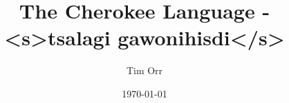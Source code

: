 \documentclass{book}
\begin{document}
\title{\Huge\bf The Cherokee Language - <s>tsalagi gawonihisdi</s>}
\author{Tim Orr}
\date{\today}
\maketitle

\tableofcontents


\setcounter{secnumdepth}{0}

\begin{comment}
chapter{Publishing Info}
%
chapter{Special Thanks}

input{whatabout.tex}

chapters go here

chapter{Verb Conjugation}
chapter{Dictionary}
chapter{Lookup by Syllable Count} Like Radical lookup in Japanese
chapter{Answers to Reading and Exercises} These would be where there are questions that have answers and where you would put dialog in tsalagi when reading syllabary.

chapter{Index}
\end{comment}


%

\begin{comment}
\chapter{new Chapter}
\subsection{Word Breakdown - Plurality Prefixes}
\label{sec:wordBreakdownPluralityPrefixes}
discuss d- before vowels, de - before consonants, and di after y-, w-, n- ahead of pronoun prefix




\end{comment}
\end{document}
